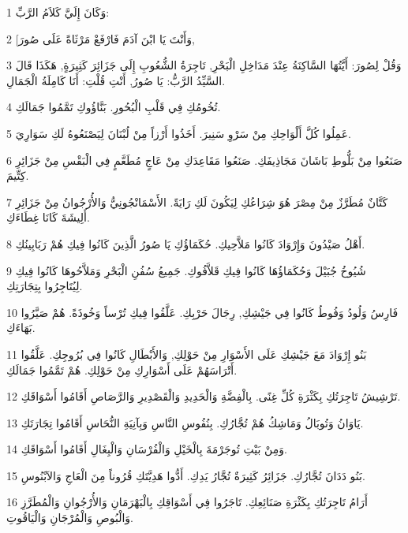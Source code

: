 \par 1 وَكَانَ إِلَيَّ كَلاَمُ الرَّبِّ:
\par 2 [وَأَنْتَ يَا ابْنَ آدَمَ فَارْفَعْ مَرْثَاةً عَلَى صُورَ,
\par 3 وَقُلْ لِصُورَ: أَيَّتُهَا السَّاكِنَةُ عِنْدَ مَدَاخِلِ الْبَحْرِ, تَاجِرَةُ الشُّعُوبِ إِلَى جَزَائِرَ كَثِيرَةٍ, هَكَذَا قَالَ السَّيِّدُ الرَّبُّ: يَا صُورُ, أَنْتِ قُلْتِ: أَنَا كَامِلَةُ الْجَمَالِ.
\par 4 تُخُومُكِ فِي قَلْبِ الْبُحُورِ. بَنَّاؤُوكِ تَمَّمُوا جَمَالَكِ.
\par 5 عَمِلُوا كُلَّ أَلْوَاحِكِ مِنْ سَرْوِ سَنِيرَ. أَخَذُوا أَرْزاً مِنْ لُبْنَانَ لِيَصْنَعُوهُ لَكِ سَوَارِيَ.
\par 6 صَنَعُوا مِنْ بَلُّوطِ بَاشَانَ مَجَاذِيفَكِ. صَنَعُوا مَقَاعِدَكِ مِنْ عَاجٍ مُطَعَّمٍ فِي الْبَقْسِ مِنْ جَزَائِرِ كِتِّيمَ.
\par 7 كَتَّانٌ مُطَرَّزٌ مِنْ مِصْرَ هُوَ شِرَاعُكِ لِيَكُونَ لَكِ رَايَةً. الأَسْمَانْجُونِيُّ وَالأُرْجُوانُ مِنْ جَزَائِرِ أَلِيشَةَ كَانَا غِطَاءَكِ.
\par 8 أَهْلُ صَيْدُونَ وَإِرْوَادَ كَانُوا مَلاَّحِيكِ. حُكَمَاؤُكِ يَا صُورُ الَّذِينَ كَانُوا فِيكِ هُمْ رَبَابِينُكِ.
\par 9 شُيُوخُ جُبَيْلَ وَحُكَمَاؤُهَا كَانُوا فِيكِ قَلاَّفُوكِ. جَمِيعُ سُفُنِ الْبَحْرِ وَمَلاَّحُوهَا كَانُوا فِيكِ لِيُتَاجِرُوا بِتِجَارَتِكِ.
\par 10 فَارِسُ وَلُودُ وَفُوطُ كَانُوا فِي جَيْشِكِ, رِجَالَ حَرْبِكِ. عَلَّقُوا فِيكِ تُرْساً وَخُوذَةً. هُمْ صَيَّرُوا بَهَاءَكِ.
\par 11 بَنُو إِرْوَادَ مَعَ جَيْشِكِ عَلَى الأَسْوَارِ مِنْ حَوْلِكِ, وَالأَبْطَالِ كَانُوا فِي بُرُوجِكِ. عَلَّقُوا أَتْرَاسَهُمْ عَلَى أَسْوَارِكِ مِنْ حَوْلِكِ. هُمْ تَمَّمُوا جَمَالَكِ.
\par 12 تَرْشِيشُ تَاجِرَتُكِ بِكَثْرَةِ كُلِّ غِنًى. بِالْفِضَّةِ وَالْحَدِيدِ وَالْقَصْدِيرِ وَالرَّصَاصِ أَقَامُوا أَسْوَاقَكِ.
\par 13 يَاوَانُ وَتُوبَالُ وَمَاشِكُ هُمْ تُجَّارُكِ. بِنُفُوسِ النَّاسِ وَبِآنِيَةِ النُّحَاسِ أَقَامُوا تِجَارَتَكِ.
\par 14 وَمِنْ بَيْتِ تُوجَرْمَةَ بِالْخَيْلِ وَالْفُرْسَانِ وَالْبِغَالِ أَقَامُوا أَسْوَاقَكِ.
\par 15 بَنُو دَدَانَ تُجَّارُكِ. جَزَائِرُ كَثِيرَةٌ تُجَّارُ يَدِكِ. أَدُّوا هَدِيَّتَكِ قُرُوناً مِنَ الْعَاجِ وَالآبْنُوسِ.
\par 16 أَرَامُ تَاجِرَتُكِ بِكَثْرَةِ صَنَائِعِكِ. تَاجَرُوا فِي أَسْوَاقِكِ بِالْبَهْرَمَانِ وَالأُرْجُوانِ وَالْمُطَرَّزِ وَالْبُوصِ وَالْمُرْجَانِ وَالْيَاقُوتِ.
